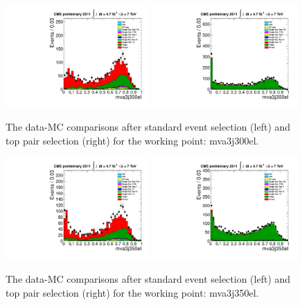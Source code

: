 \begin{figure}[!t]
  \centering
  \includegraphics[width=0.49\textwidth]{figs/cl-mva3j300el-normal.pdf}
  \includegraphics[width=0.49\textwidth]{figs/cl-mva3j300el-inTTbar.pdf}
  \caption{\label{fig:mva:plots-mva3j300el} The data-MC comparisons
    after standard event selection (left) and top pair
    selection (right) for the working point: mva3j300el.}
\end{figure}

\begin{figure}[!t]
  \centering
  \includegraphics[width=0.49\textwidth]{figs/cl-mva3j350el-normal.pdf}
  \includegraphics[width=0.49\textwidth]{figs/cl-mva3j350el-inTTbar.pdf}
  \caption{\label{fig:mva:plots-mva3j350el} The data-MC comparisons
    after standard event selection (left) and top pair
    selection (right) for the working point: mva3j350el.}
\end{figure}

